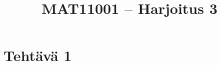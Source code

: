 \documentclass{article}
\begin{document}
	
	\title{MAT11001 – Harjoitus 3}
	\date{}
	\maketitle
	
	
	\section*{Tehtävä 1}
\end{document}
